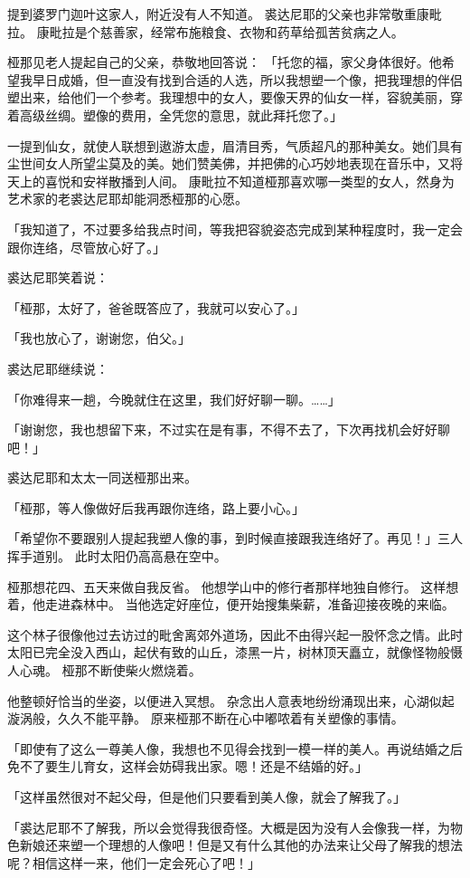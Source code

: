 \documentclass[twoside,openany]{book}
\begin{document}
提到婆罗门迦叶这家人，附近没有人不知道。
裘达尼耶的父亲也非常敬重康毗拉。
康毗拉是个慈善家，经常布施粮食、衣物和药草给孤苦贫病之人。

桠那见老人提起自己的父亲，恭敬地回答说：
「托您的福，家父身体很好。他希望我早日成婚，但一直没有找到合适的人选，所以我想塑一个像，把我理想的伴侣塑出来，给他们一个参考。我理想中的女人，要像天界的仙女一样，容貌美丽，穿着高级丝绸。塑像的费用，全凭您的意思，就此拜托您了。」

一提到仙女，就使人联想到遨游太虚，眉清目秀，气质超凡的那种美女。她们具有尘世间女人所望尘莫及的美。她们赞美佛，并把佛的心巧妙地表现在音乐中，又将天上的喜悦和安祥散播到人间。
康毗拉不知道桠那喜欢哪一类型的女人，然身为艺术家的老裘达尼耶却能洞悉桠那的心愿。

「我知道了，不过要多给我点时间，等我把容貌姿态完成到某种程度时，我一定会跟你连络，尽管放心好了。」

裘达尼耶笑着说：

「桠那，太好了，爸爸既答应了，我就可以安心了。」

「我也放心了，谢谢您，伯父。」

裘达尼耶继续说：

「你难得来一趟，今晚就住在这里，我们好好聊一聊。……」

「谢谢您，我也想留下来，不过实在是有事，不得不去了，下次再找机会好好聊吧！」

裘达尼耶和太太一同送桠那出来。

「桠那，等人像做好后我再跟你连络，路上要小心。」

「希望你不要跟别人提起我塑人像的事，到时候直接跟我连络好了。再见！」三人挥手道别。
此时太阳仍高高悬在空中。

桠那想花四、五天来做自我反省。
他想学山中的修行者那样地独自修行。
这样想着，他走进森林中。
当他选定好座位，便开始搜集柴薪，准备迎接夜晚的来临。

这个林子很像他过去访过的毗舍离郊外道场，因此不由得兴起一股怀念之情。此时太阳已完全没入西山，起伏有致的山丘，漆黑一片，树林顶天矗立，就像怪物般慑人心魂。
桠那不断使柴火燃烧着。

他整顿好恰当的坐姿，以便进入冥想。
杂念出人意表地纷纷涌现出来，心湖似起漩涡般，久久不能平静。
原来桠那不断在心中嘟哝着有关塑像的事情。

「即使有了这么一尊美人像，我想也不见得会找到一模一样的美人。再说结婚之后免不了要生儿育女，这样会妨碍我出家。嗯！还是不结婚的好。」

「这样虽然很对不起父母，但是他们只要看到美人像，就会了解我了。」

「裘达尼耶不了解我，所以会觉得我很奇怪。大概是因为没有人会像我一样，为物色新娘还来塑一个理想的人像吧！但是又有什么其他的办法来让父母了解我的想法呢？相信这样一来，他们一定会死心了吧！」
\end{document}
